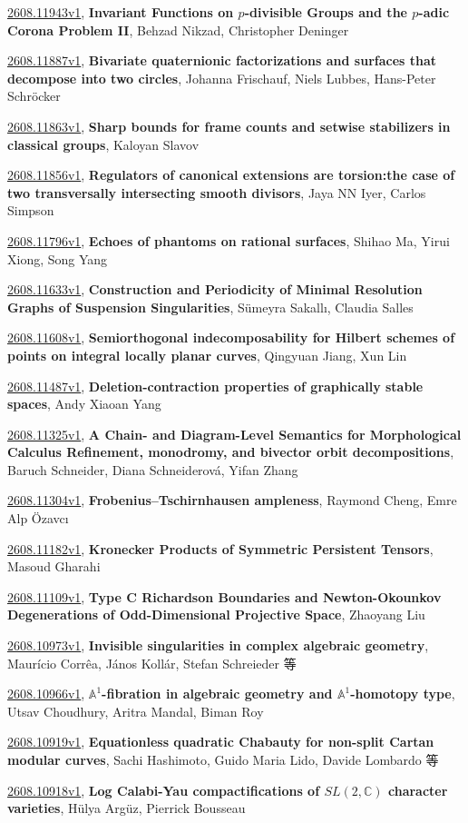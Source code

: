 \documentclass[9pt, a4paper]{article}
\theoremstyle{plain}
\theoremstyle{definition}
\theoremstyle{remark}
\newcommand{\arxiv}[3]{\href{https://arxiv.org/abs/#1}{#1}, \textbf{\textcolor{arxivblue}{#2}}, #3}
\begin{document}
\arxiv{2608.11943v1}{Invariant Functions on $p$-divisible Groups and the $p$-adic Corona Problem II}{Behzad Nikzad, Christopher Deninger}

\arxiv{2608.11887v1}{Bivariate quaternionic factorizations and surfaces that decompose into two circles}{Johanna Frischauf, Niels Lubbes, Hans-Peter Schröcker}

\arxiv{2608.11863v1}{Sharp bounds for frame counts and setwise stabilizers in classical groups}{Kaloyan Slavov}

\arxiv{2608.11856v1}{Regulators of canonical extensions are torsion:the case of two transversally intersecting smooth divisors}{Jaya NN Iyer, Carlos Simpson}

\arxiv{2608.11796v1}{Echoes of phantoms on rational surfaces}{Shihao Ma, Yirui Xiong, Song Yang}

\arxiv{2608.11633v1}{Construction and Periodicity of Minimal Resolution Graphs of Suspension Singularities}{Sümeyra Sakallı, Claudia Salles}

\arxiv{2608.11608v1}{Semiorthogonal indecomposability for Hilbert schemes of points on integral locally planar curves}{Qingyuan Jiang, Xun Lin}

\arxiv{2608.11487v1}{Deletion-contraction properties of graphically stable spaces}{Andy Xiaoan Yang}

\arxiv{2608.11325v1}{A Chain- and Diagram-Level Semantics for Morphological Calculus Refinement, monodromy, and bivector orbit decompositions}{Baruch Schneider, Diana Schneiderová, Yifan Zhang}

\arxiv{2608.11304v1}{Frobenius--Tschirnhausen ampleness}{Raymond Cheng, Emre Alp Özavcı}

\arxiv{2608.11182v1}{Kronecker Products of Symmetric Persistent Tensors}{Masoud Gharahi}

\arxiv{2608.11109v1}{Type C Richardson Boundaries and Newton-Okounkov Degenerations of Odd-Dimensional Projective Space}{Zhaoyang Liu}

\arxiv{2608.10973v1}{Invisible singularities in complex algebraic geometry}{Maurício Corrêa, János Kollár, Stefan Schreieder 等}

\arxiv{2608.10966v1}{$\mathbb{A}^1$-fibration in algebraic geometry and $\mathbb{A}^1$-homotopy type}{Utsav Choudhury, Aritra Mandal, Biman Roy}

\arxiv{2608.10919v1}{Equationless quadratic Chabauty for non-split Cartan modular curves}{Sachi Hashimoto, Guido Maria Lido, Davide Lombardo 等}

\arxiv{2608.10918v1}{Log Calabi-Yau compactifications of $SL(2,\mathbb{C})$ character varieties}{Hülya Argüz, Pierrick Bousseau}
\end{document}
